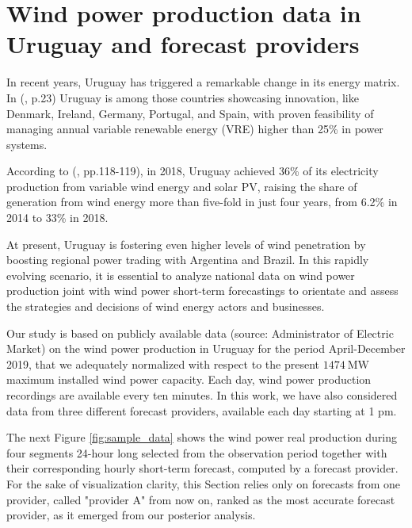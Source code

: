 \documentclass[11pt]{article}
\theoremstyle{definition}
\begin{document}


\section{Wind power production data in Uruguay and forecast providers } \label{Section_2}

In recent years, Uruguay has triggered a remarkable change in its energy matrix. In (\cite{irena}, p.23) Uruguay is among those countries showcasing innovation, like Denmark, Ireland, Germany, Portugal, and Spain, with proven feasibility of managing annual variable renewable energy (VRE) higher than 25\% in power systems. 

According to (\cite{ren21}, pp.118-119), in 2018, Uruguay achieved 36\% of its electricity production from variable wind energy and solar PV, raising the share of generation from wind energy more than five-fold in just four years, from 6.2\% in 2014 to 33\% in 2018. 

At present, Uruguay is fostering even higher levels of wind penetration by boosting regional power trading with Argentina and Brazil. 
In this rapidly evolving scenario, it is essential to analyze national data on wind power production joint with wind power short-term forecastings to orientate and assess the strategies and decisions of wind energy actors and businesses. 

Our study is based on publicly available data (source: Administrator of Electric Market) on the wind power production in Uruguay for the period April-December 2019, that we adequately normalized with respect to the present $\SI{1474}{\mega\watt}$ maximum installed wind power capacity. Each day, wind power production recordings are available every ten minutes.  In this work, we have also considered data from three different forecast providers, available each day starting at 1 pm.

The next Figure \ref{fig:sample_data} shows the wind power real production during four segments 24-hour long selected from the observation period together with their corresponding hourly short-term forecast, computed by a forecast provider. For the sake of visualization clarity, this Section relies only on forecasts from one provider, called "provider A" from now on, ranked as the most accurate forecast provider, as it emerged from our posterior analysis. 
\end{document}
